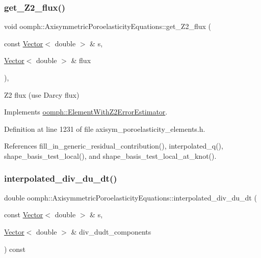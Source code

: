 \subsubsection{\texorpdfstring{get\+\_\+\+Z2\+\_\+flux()}{get\_Z2\_flux()}}
{\footnotesize\ttfamily void oomph\+::\+Axisymmetric\+Poroelasticity\+Equations\+::get\+\_\+\+Z2\+\_\+flux (\begin{DoxyParamCaption}\item[{const \hyperlink{classoomph_1_1Vector}{Vector}$<$ double $>$ \&}]{s,  }\item[{\hyperlink{classoomph_1_1Vector}{Vector}$<$ double $>$ \&}]{flux }\end{DoxyParamCaption})\hspace{0.3cm}{\ttfamily [inline]}, {\ttfamily [virtual]}}



Z2 flux (use Darcy flux) 



Implements \hyperlink{classoomph_1_1ElementWithZ2ErrorEstimator_a5688ff5f546d81771cabad82ca5a7556}{oomph\+::\+Element\+With\+Z2\+Error\+Estimator}.



Definition at line 1231 of file axisym\+\_\+poroelasticity\+\_\+elements.\+h.



References fill\+\_\+in\+\_\+generic\+\_\+residual\+\_\+contribution(), interpolated\+\_\+q(), shape\+\_\+basis\+\_\+test\+\_\+local(), and shape\+\_\+basis\+\_\+test\+\_\+local\+\_\+at\+\_\+knot().

\mbox{\label{classoomph_1_1AxisymmetricPoroelasticityEquations_ab13e72b1a71a8a2d3dde4290e6404fb2}} 
\subsubsection{\texorpdfstring{interpolated\+\_\+div\+\_\+du\+\_\+dt()}{interpolated\_div\_du\_dt()}}
{\footnotesize\ttfamily double oomph\+::\+Axisymmetric\+Poroelasticity\+Equations\+::interpolated\+\_\+div\+\_\+du\+\_\+dt (\begin{DoxyParamCaption}\item[{const \hyperlink{classoomph_1_1Vector}{Vector}$<$ double $>$ \&}]{s,  }\item[{\hyperlink{classoomph_1_1Vector}{Vector}$<$ double $>$ \&}]{div\+\_\+dudt\+\_\+components }\end{DoxyParamCaption}) const\hspace{0.3cm}{\ttfamily [inline]}}

